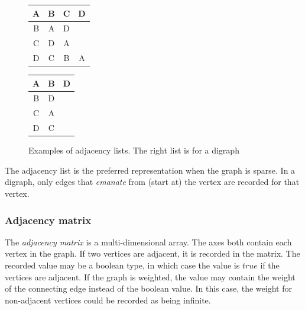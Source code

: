 \documentclass{article}
\begin{document}
\begin{figure}[H]
  \centering
  \begin{tabular}{|c|c c c|}
    \hline
    A  & B & C & D  \\ [0.5ex]
    \hline
    B  & A & D & \  \\
    \hline
    C  & D & A & \  \\
    \hline
    D  & C & B & A  \\
    \hline
  \end{tabular}
  \quad
  \begin{tabular}{|c|c c|}
    \hline
    A  & B & D  \\ [0.5ex]
    \hline
    B  & D & \  \\
    \hline
    C  & A & \  \\
    \hline
    D  & C & \  \\
    \hline
  \end{tabular}
  \caption{Examples of adjacency lists. The right list is for a digraph}
\end{figure}

The adjacency list is the preferred representation when the graph is sparse.
In a digraph, only edges that {\em emanate} from (start at) the vertex are recorded for that vertex.

\subsubsection{Adjacency matrix}
The {\em adjacency matrix} is a multi-dimensional array. The axes both contain each vertex in the graph.
If two vertices are adjacent, it is recorded in the matrix. The recorded value may be a boolean type, in which
case the value is \(true\) if the vertices are adjacent. If the graph is weighted, the value may contain the
weight of the connecting edge instead of the boolean value. In this case, the weight for non-adjacent vertices
could be recorded as being infinite.
\end{document}
